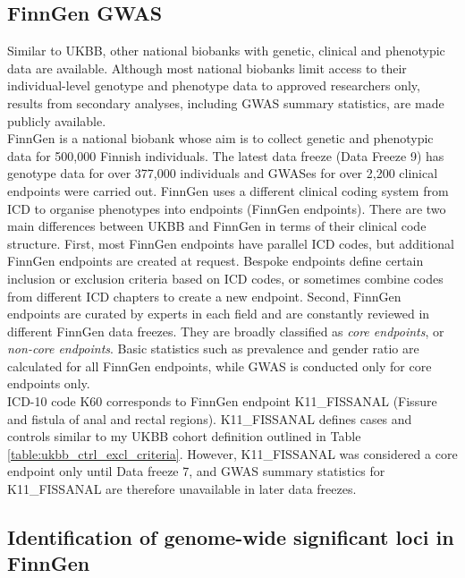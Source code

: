   



      \subsection{FinnGen GWAS}
      Similar to UKBB, other national biobanks with genetic, clinical and phenotypic data are available. Although most national biobanks limit access to their individual-level genotype and phenotype data to approved researchers only, results from secondary analyses, including GWAS summary statistics, are made publicly available. \\

      FinnGen is a national biobank whose aim is to collect genetic and phenotypic data for 500,000 Finnish individuals. The latest data freeze (Data Freeze 9) has genotype data for over 377,000 individuals and GWASes for over 2,200 clinical endpoints were carried out. FinnGen uses a different clinical coding system from ICD to organise phenotypes into endpoints (FinnGen endpoints). There are two main differences between UKBB and FinnGen in terms of their clinical code structure. First, most FinnGen endpoints have parallel ICD codes, but additional FinnGen endpoints are created at request. Bespoke endpoints define certain inclusion or exclusion criteria based on ICD codes, or sometimes combine codes from different ICD chapters to create a new endpoint. Second, FinnGen endpoints are curated by experts in each field and are constantly reviewed in different FinnGen data freezes. They are broadly classified as \textit{core endpoints}, or \textit{non-core endpoints}. Basic statistics such as prevalence and gender ratio are calculated for all FinnGen endpoints, while GWAS is conducted only for core endpoints only.\\

ICD-10 code K60 corresponds to FinnGen endpoint K11\_FISSANAL (Fissure and fistula of anal and rectal regions). K11\_FISSANAL defines cases and controls similar to my UKBB cohort definition outlined in Table \ref{table:ukbb_ctrl_excl_criteria}. However, K11\_FISSANAL was considered a core endpoint only until Data freeze 7, and GWAS summary statistics for K11\_FISSANAL are therefore unavailable in later data freezes. 

\subsection{Identification of genome-wide significant loci in FinnGen}

